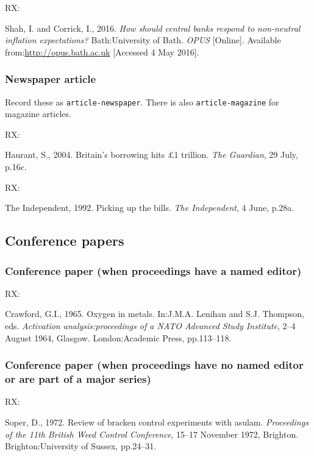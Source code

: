 RX: \cite{shah.corrick2016hsc}

Shah, I. and Corrick, I., 2016. \emph{How should central banks respond to non-neutral inflation expectations?} Bath:\@ University of Bath. \emph{OPUS} [Online]. Available from:\@ \url{http://opus.bath.ac.uk} [Accessed 4 May 2016].



\subsubsection*{Newspaper article}

Record these as \texttt{article-newspaper}. There is also \texttt{article-magazine} for magazine articles.

RX: \cite{haurant2004bbh}

Haurant, S., 2004. Britain's borrowing hits £1 trillion. \emph{The Guardian}, 29 July, p.16c.


RX: \cite{independent1992pub}

The Independent, 1992. Picking up the bills. \emph{The Independent}, 4 June, p.28a.



\subsection{Conference papers}

\subsubsection*{Conference paper (when proceedings have a named editor)}

RX: \cite{crawford1965oim}

Crawford, G.I., 1965. Oxygen in metals. In:\@ J.M.A. Lenihan and S.J. Thompson, eds. \emph{Activation analysis:\@ proceedings of a NATO Advanced Study Institute}, 2--4 August 1964, Glasgow. London:\@ Academic Press, pp.113--118.



\subsubsection*{Conference paper (when proceedings have no named editor or are part of a major series)}

RX: \cite{soper1972rbc}

Soper, D., 1972. Review of bracken control experiments with asulam. \emph{Proceedings of the 11th British Weed Control Conference}, 15--17 November 1972, Brighton. Brighton:\@ University of Sussex, pp.24--31.



